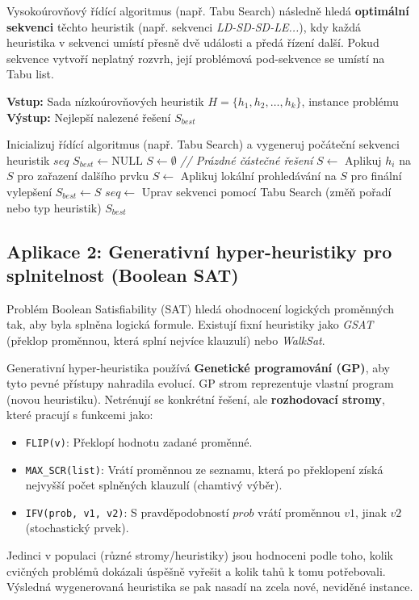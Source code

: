 \documentclass[12pt,a4paper]{article}
\theoremstyle{definition}
\begin{document}
Vysokoúrovňový řídící algoritmus (např. Tabu Search) následně hledá \textbf{optimální sekvenci} těchto heuristik (např. sekvenci \textit{LD-SD-SD-LE...}), kdy každá heuristika v sekvenci umístí přesně dvě události a předá řízení další. Pokud sekvence vytvoří neplatný rozvrh, její problémová pod-sekvence se umístí na Tabu list.

\begin{algorithm}[H]
\caption{Výběrová hyper-heuristika (Selection Hyper-heuristic)}
\textbf{Vstup:} Sada nízkoúrovňových heuristik $H = \{h_1, h_2, \dots, h_k\}$, instance problému \\
\textbf{Výstup:} Nejlepší nalezené řešení $S_{best}$
\begin{algorithmic}[1]
\STATE Inicializuj řídící algoritmus (např. Tabu Search) a vygeneruj počáteční sekvenci heuristik $seq$
\STATE $S_{best} \gets \text{NULL}$
    \STATE $S \gets \emptyset$ \textit{// Prázdné částečné řešení}
        \STATE $S \gets$ Aplikuj $h_i$ na $S$ pro zařazení dalšího prvku
    \ENDFOR
    \STATE $S \gets$ Aplikuj lokální prohledávání na $S$ pro finální vylepšení
        \STATE $S_{best} \gets S$
    \ENDIF
    \STATE $seq \gets$ Uprav sekvenci pomocí Tabu Search (změň pořadí nebo typ heuristik)
\ENDWHILE
\RETURN $S_{best}$
\end{algorithmic}
\end{algorithm}

\subsection{Aplikace 2: Generativní hyper-heuristiky pro splnitelnost (Boolean SAT)}
Problém Boolean Satisfiability (SAT) hledá ohodnocení logických proměnných tak, aby byla splněna logická formule. Existují fixní heuristiky jako \textit{GSAT} (překlop proměnnou, která splní nejvíce klauzulí) nebo \textit{WalkSat}.

Generativní hyper-heuristika používá \textbf{Genetické programování (GP)}, aby tyto pevné přístupy nahradila evolucí. GP strom reprezentuje vlastní program (novou heuristiku). Netrénují se konkrétní řešení, ale \textbf{rozhodovací stromy}, které pracují s funkcemi jako:
\begin{itemize}
    \item \texttt{FLIP(v)}: Překlopí hodnotu zadané proměnné.
    \item \texttt{MAX\_SCR(list)}: Vrátí proměnnou ze seznamu, která po překlopení získá nejvyšší počet splněných klauzulí (chamtivý výběr).
    \item \texttt{IFV(prob, v1, v2)}: S pravděpodobností $prob$ vrátí proměnnou $v1$, jinak $v2$ (stochastický prvek).
\end{itemize}
Jedinci v populaci (různé stromy/heuristiky) jsou hodnoceni podle toho, kolik cvičných problémů dokázali úspěšně vyřešit a kolik tahů k tomu potřebovali. Výsledná wygenerovaná heuristika se pak nasadí na zcela nové, neviděné instance.
\end{document}
